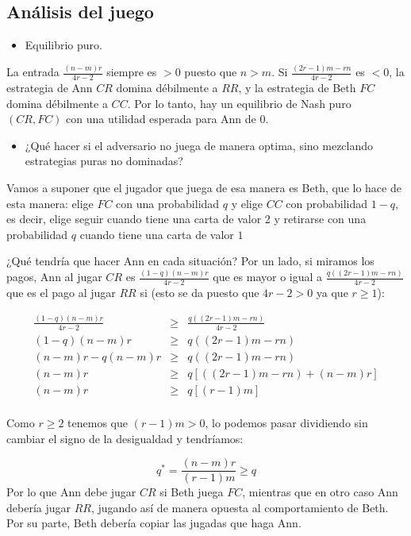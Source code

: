 \documentclass[12pt,a4paper,]{book}
\providecommand{\tightlist}{%
  \setlength{\itemsep}{0pt}\setlength{\parskip}{0pt}}
\numberwithin{dummy}{section}
\theoremstyle{ocrenumbox}
\theoremstyle{blacknumex}
\theoremstyle{blacknumbox}
\theoremstyle{ocrenum}
\theoremstyle{ocrenum}
\begin{document}
\hypertarget{Seccion512}{%
\subsection{Análisis del juego}\label{Seccion512}}

\begin{itemize}
\tightlist
\item
  Equilibrio puro.
\end{itemize}

La entrada \(\frac{(n-m)r}{4r-2}\) siempre es \(>0\) puesto que \(n>m\).
Si \(\frac{(2r-1)m-rn}{4r-2}\) es \(<0\), la estrategia de Ann \(CR\)
domina débilmente a \(RR\), y la estrategia de Beth \(FC\) domina
débilmente a \(CC\). Por lo tanto, hay un equilibrio de Nash puro
\((CR,FC)\) con una utilidad esperada para Ann de \(0\).

\begin{itemize}
\tightlist
\item
  ¿Qué hacer si el adversario no juega de manera optima, sino mezclando
  estrategias puras no dominadas?
\end{itemize}

Vamos a suponer que el jugador que juega de esa manera es Beth, que lo
hace de esta manera: elige \(FC\) con una probabilidad \(q\) y elige
\(CC\) con probabilidad \(1-q\), es decir, elige seguir cuando tiene una
carta de valor 2 y retirarse con una probabilidad \(q\) cuando tiene una
carta de valor \(1\)

¿Qué tendría que hacer Ann en cada situación? Por un lado, si miramos
los pagos, Ann al jugar \(CR\) es \(\frac{(1-q)(n-m)r}{4r-2}\) que es
mayor o igual a \(\frac{q((2r-1)m-rn)}{4r-2}\) que es el pago al jugar
\(RR\) si (esto se da puesto que \(4r-2>0\) ya que \(r \geq 1\)):

\[
\begin{array}{rcl}
\frac{(1-q)(n-m)r}{4r-2} & \geq &\frac{q((2r-1)m-rn)}{4r-2}\\
(1-q)(n-m)r & \geq & q((2r-1)m-rn) \\
(n-m)r -q(n-m)r & \geq & q((2r-1)m-rn)\\
(n-m)r & \geq & q[((2r-1)m-rn)+(n-m)r]\\
(n-m)r & \geq & q[(r-1)m]\\
\end{array}
\]

Como \(r \geq 2\) tenemos que \((r-1)m >0\), lo podemos pasar dividiendo
sin cambiar el signo de la desigualdad y tendríamos:

\[
q^* = \frac{(n-m)r}{(r-1)m} \geq q
\] Por lo que Ann debe jugar \(CR\) si Beth juega \(FC\), mientras que
en otro caso Ann debería jugar \(RR\), jugando así de manera opuesta al
comportamiento de Beth. Por su parte, Beth debería copiar las jugadas
que haga Ann.
\end{document}
